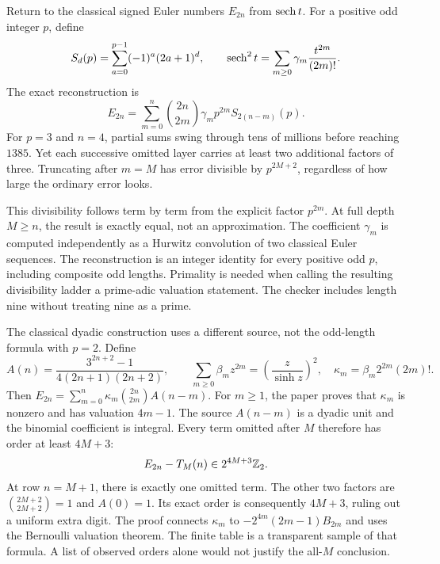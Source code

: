 Return to the classical signed Euler numbers $E_{2n}$ from $\operatorname{sech} t$. For a positive odd integer $p$, define
\[
 S_d(p)=\sum_{a=0}^{p-1}(-1)^a(2a+1)^d,
 \qquad \operatorname{sech}^2t=\sum_{m\ge0}\gamma_m\frac{t^{2m}}{(2m)!}.
\]
The exact reconstruction is
\[
 E_{2n}=\sum_{m=0}^n\binom{2n}{2m}\gamma_m p^{2m}S_{2(n-m)}(p).
\]
For $p=3$ and $n=4$, partial sums swing through tens of millions before reaching $1385$. Yet each successive omitted layer carries at least two additional factors of three. Truncating after $m=M$ has error divisible by $p^{2M+2}$, regardless of how large the ordinary error looks.

This divisibility follows term by term from the explicit factor $p^{2m}$. At full depth $M\ge n$, the result is exactly equal, not an approximation. The coefficient $\gamma_m$ is computed independently as a Hurwitz convolution of two classical Euler sequences.
The reconstruction is an integer identity for every positive odd $p$, including composite odd lengths. Primality is needed when calling the resulting divisibility ladder a prime-adic valuation statement. The checker includes length nine without treating nine as a prime.

The classical dyadic construction uses a different source, not the odd-length formula with $p=2$. Define
\[
 A(n)=\frac{3^{2n+2}-1}{4(2n+1)(2n+2)},\qquad
 \sum_{m\ge0}\beta_mz^{2m}=\left(\frac z{\sinh z}\right)^2,
 \quad\kappa_m=\beta_m2^{2m}(2m)!.
\]
Then $E_{2n}=\sum_{m=0}^n\kappa_m\binom{2n}{2m}A(n-m)$.
For $m\ge1$, the paper proves that $\kappa_m$ is nonzero and has valuation $4m-1$. The source $A(n-m)$ is a dyadic unit and the binomial coefficient is integral. Every term omitted after $M$ therefore has order at least $4M+3$:
\[
 E_{2n}-T_M(n)\in2^{4M+3}\mathbb Z_2.
\]
At row $n=M+1$, there is exactly one omitted term. The other two factors are $\binom{2M+2}{2M+2}=1$ and $A(0)=1$. Its exact order is consequently $4M+3$, ruling out a uniform extra digit.
The proof connects $\kappa_m$ to $-2^{4m}(2m-1)B_{2m}$ and uses the Bernoulli valuation theorem. The finite table is a transparent sample of that formula. A list of observed orders alone would not justify the all-$M$ conclusion.

